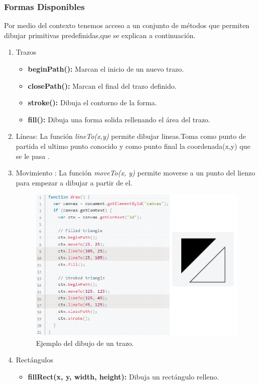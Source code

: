 \subsubsection*{Formas Disponibles}
Por medio del contexto tenemos acceso a un conjunto de métodos que permiten dibujar primitivas predefinidas,que se explican a continuación.
\begin{enumerate}
\item Trazos
	\begin{itemize}
      \item \textbf{beginPath():} Marcan el inicio de un nuevo trazo.
      \item \textbf{closePath():} Marcan el final del trazo definido.
      \item \textbf{stroke():} Dibuja el contorno de la forma.
      \item \textbf{fill():} Dibuja una forma solida rellenando el área del trazo.
	\end{itemize}
\item Líneas: La función \textit{lineTo(x,y)} permite dibujar lineas.Toma como punto de partida el ultimo punto conocido y como  punto final la coordenada(x,y) que se le pasa .
\item Movimiento : La función \textit{moveTo(x, y)} permite moverse a un punto del lienzo para empezar a dibujar a partir de el.
\begin{figure}[!h]
\begin{center}
   \includegraphics[width=0.7\linewidth]{Figures/lineas_Canvas}
	\decoRule
	\caption[Ejemplo del dibujo de un trazo]{Ejemplo del dibujo de un trazo.}
\label{fig:lineas_Canvas}
\end{center}
\end{figure}
\item Rectángulos
	\begin{itemize}
  		\item \textbf{fillRect(x, y, width, height):} Dibuja un rectángulo relleno.

\end{itemize}
\end{enumerate}
